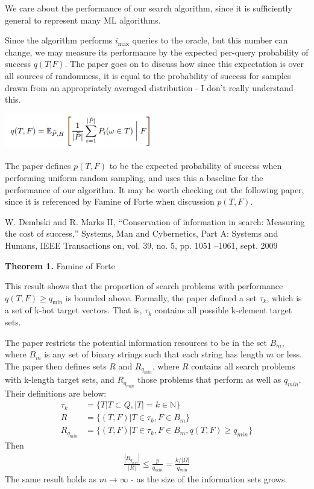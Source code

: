 \documentclass[12pt]{article}
\begin{document}
We care about the performance of our search algorithm, since it is sufficiently general to represent many ML algorithms. 

Since the algorithm performs $i_{\text{max}}$ queries to the oracle, but this number can change, we may measure its performance by the expected per-query probability of success $q(T|F)$. The paper goes on to discuss how since this expectation is over all sources of randomness, it is equal to the probability of success for samples drawn from an appropriately averaged distribution - I don't really understand this. 

\begin{center}
    \includegraphics{FamineForte/ExpectedSuccess.PNG}
\end{center}

The paper defines $p(T,F)$ to be the expected probability of success when performing uniform random sampling, and uses this a baseline for the performance of our algorithm. It may be worth checking out the following paper, since it is referenced by Famine of Forte when discussion $p(T,F)$. 


W. Dembski and R. Marks II, “Conservation of information in search:
Measuring the cost of success,” Systems, Man and Cybernetics, Part A:
Systems and Humans, IEEE Transactions on, vol. 39, no. 5, pp. 1051
–1061, sept. 2009

\textbf{Theorem 1.} Famine of Forte

This result shows that the proportion of search problems with performance $q(T,F) \geq q_{\text{min}}$ is bounded above. Formally, the paper defined a set $\tau_k$, which is a set of k-hot target vectors. That is, $\tau_k$ contains all possible k-element target sets. 

The paper restricts the potential information resources to be in the set $B_m$, where $B_m$ is any set of binary strings such that each string has length $m$ or less. The paper then defines sets $R$ and $R_{q_{min}}$, where $R$ contains all search problems with k-length target sets, and $R_{q_{min}}$ those problems that perform as well as $q_{min}$. Their definitions are below: 
\begin{align*}
    \tau_k &= \{T | T \subset Q, |T| = k \in \mathds{N}\} \\ 
    R &= \{(T,F) | T \in \tau_k, F \in B_m\} \\
    R_{q_{min}} &= \{(T,F) | T \in \tau_k, F \in B_m, q(T,F) \geq q_{min}\}
\end{align*}
Then 
\begin{align*}
    \frac{|R_{q_{min}}|}{|R|} \leq \frac{p}{q_{min}} = \frac{k / |\Omega|}{q_{min}}
\end{align*}
The same result holds as $m \to \infty$ - as the size of the information sets grows.
\end{document}
